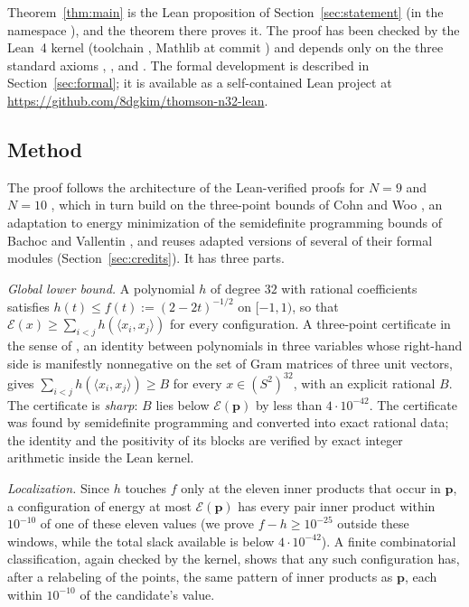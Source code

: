 \documentclass[11pt]{amsart}
\theoremstyle{definition}
\theoremstyle{remark}
\newcommand{\Sph}{S^{2}}
\newcommand{\ip}[2]{\langle #1,#2\rangle}
\newcommand{\E}{\mathcal{E}}
\newcommand{\cand}{\mathbf{p}}
\begin{document}
Theorem~\ref{thm:main} is the Lean proposition  of Section~\ref{sec:statement} (in the namespace ), and the theorem  there proves it. The proof has been checked by the Lean~4 kernel (toolchain , Mathlib at commit ) and depends only on the three standard axioms , , and . The formal development is described in Section~\ref{sec:formal}; it is available as a self-contained Lean project at \url{https://github.com/8dgkim/thomson-n32-lean}.

\subsection{Method}

The proof follows the architecture of the Lean-verified proofs for $N=9$ and $N=10$ \cite{ThomsonN9,GrahamThomson102026}, which in turn build on the three-point bounds of Cohn and Woo \cite{CohnWoo2012}, an adaptation to energy minimization of the semidefinite programming bounds of Bachoc and Vallentin \cite{BachocVallentin2008}, and reuses adapted versions of several of their formal modules (Section~\ref{sec:credits}). It has three parts.

\emph{Global lower bound.} A polynomial $h$ of degree $32$ with rational coefficients satisfies $h(t)\le f(t):=(2-2t)^{-1/2}$ on $[-1,1)$, so that $\E(x)\ge\sum_{i<j}h(\ip{x_i}{x_j})$ for every configuration. A three-point certificate in the sense of \cite{CohnWoo2012}, an identity between polynomials in three variables whose right-hand side is manifestly nonnegative on the set of Gram matrices of three unit vectors, gives $\sum_{i<j}h(\ip{x_i}{x_j})\ge B$ for every $x\in(\Sph)^{32}$, with an explicit rational $B$. The certificate is \emph{sharp}: $B$ lies below $\E(\cand)$ by less than $4\cdot10^{-42}$. The certificate was found by semidefinite programming and converted into exact rational data; the identity and the positivity of its blocks are verified by exact integer arithmetic inside the Lean kernel.

\emph{Localization.} Since $h$ touches $f$ only at the eleven inner products that occur in $\cand$, a configuration of energy at most $\E(\cand)$ has every pair inner product within $10^{-10}$ of one of these eleven values (we prove $f-h\ge 10^{-25}$ outside these windows, while the total slack available is below $4\cdot10^{-42}$). A finite combinatorial classification, again checked by the kernel, shows that any such configuration has, after a relabeling of the points, the same pattern of inner products as $\cand$, each within $10^{-10}$ of the candidate's value.
\end{document}
